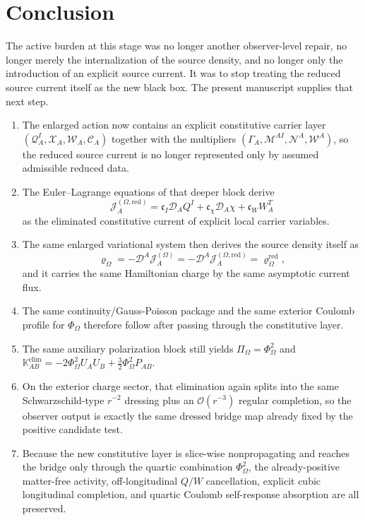 \documentclass[11pt]{article}
\newcommand{\ProjSub}{P}
\newcommand{\SpatialD}{\mathcal D}
\newcommand{\FlowPot}{\Phi_\Omega}
\newcommand{\BalanceField}{\Pi_\Omega}
\newcommand{\SourceDensity}{\varrho_\Omega}
\newcommand{\SourceDensityRed}{\varrho_\Omega^{\mathrm{red}}}
\newcommand{\SourceCurrent}{\mathcal J^{(\Omega)}}
\newcommand{\SourceCurrentRed}{\mathcal J^{(\Omega,\mathrm{red})}}
\newcommand{\ConstCurrent}{\mathcal C}
\newcommand{\QCarrier}{\mathcal Q}
\newcommand{\ChiCarrier}{\mathcal X}
\newcommand{\TransCarrier}{\mathcal W}
\newcommand{\ConstGamma}{\Gamma}
\newcommand{\QMult}{\mathscr M}
\newcommand{\ChiMult}{\mathscr N}
\newcommand{\TransMult}{\mathscr W}
\newcommand{\AuxPol}{\mathbb K}
\begin{document}
\section{Conclusion}

The active burden at this stage was no longer another observer-level repair, no longer merely the internalization of the source density, and no longer only the introduction of an explicit source current. It was to stop treating the reduced source current itself as the new black box. The present manuscript supplies that next step.

\begin{enumerate}
    \item The enlarged action now contains an explicit constitutive carrier layer \((\QCarrier^I_A,\ChiCarrier_A,\TransCarrier_A,\ConstCurrent_A)\) together with the multipliers \((\ConstGamma_A,\QMult^{AI},\ChiMult^A,\TransMult^A)\), so the reduced source current is no longer represented only by assumed admissible reduced data.
    \item The Euler--Lagrange equations of that deeper block derive
    \[
    \SourceCurrentRed_A
    =
    \mathfrak c_I\SpatialD_AQ^I
    +\mathfrak c_\chi\SpatialD_A\chi
    +\mathfrak c_WW_A^T
    \]
    as the eliminated constitutive current of explicit local carrier variables.
    \item The same enlarged variational system then derives the source density itself as
    \[
    \SourceDensity=-\SpatialD^A\SourceCurrent_A=-\SpatialD^A\SourceCurrentRed_A=\SourceDensityRed,
    \]
    and it carries the same Hamiltonian charge by the same asymptotic current flux.
    \item The same continuity/Gauss-Poisson package and the same exterior Coulomb profile for \(\FlowPot\) therefore follow after passing through the constitutive layer.
    \item The same auxiliary polarization block still yields \(\BalanceField=\FlowPot^2\) and \(\AuxPol_{AB}^{\mathrm{elim}}=-2\FlowPot^2U_AU_B+\tfrac32\FlowPot^2\ProjSub_{AB}\).
    \item On the exterior charge sector, that elimination again splits into the same Schwarzschild-type \(r^{-2}\) dressing plus an \(\mathcal O(r^{-3})\) regular completion, so the observer output is exactly the same dressed bridge map already fixed by the positive candidate test.
    \item Because the new constitutive layer is slice-wise nonpropagating and reaches the bridge only through the quartic combination \(\FlowPot^2\), the already-positive matter-free activity, off-longitudinal \(Q/W\) cancellation, explicit cubic longitudinal completion, and quartic Coulomb self-response absorption are all preserved.
\end{enumerate}
\end{document}
